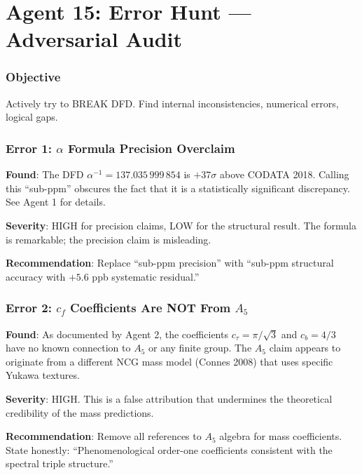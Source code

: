 \documentclass[11pt,a4paper]{article}
\begin{document}
\part{Agent 15: Error Hunt --- Adversarial Audit}
\label{part:errors}

\section{Objective}

Actively try to BREAK DFD. Find internal inconsistencies, numerical errors, logical gaps.

\section{Error 1: $\alpha$ Formula Precision Overclaim}

\textbf{Found}: The DFD $\alpha^{-1} = 137.035\,999\,854$ is $+37\sigma$ above CODATA 2018. Calling this ``sub-ppm'' obscures the fact that it is a statistically significant discrepancy. See Agent 1 for details.

\textbf{Severity}: HIGH for precision claims, LOW for the structural result. The formula is remarkable; the precision claim is misleading.

\textbf{Recommendation}: Replace ``sub-ppm precision'' with ``sub-ppm structural accuracy with $+5.6$ ppb systematic residual.''

\section{Error 2: $c_f$ Coefficients Are NOT From $A_5$}

\textbf{Found}: As documented by Agent 2, the coefficients $c_\tau = \pi/\sqrt{3}$ and $c_b = 4/3$ have no known connection to $A_5$ or any finite group. The $A_5$ claim appears to originate from a different NCG mass model (Connes 2008) that uses specific Yukawa textures.

\textbf{Severity}: HIGH. This is a false attribution that undermines the theoretical credibility of the mass predictions.

\textbf{Recommendation}: Remove all references to $A_5$ algebra for mass coefficients. State honestly: ``Phenomenological order-one coefficients consistent with the spectral triple structure.''
\end{document}
